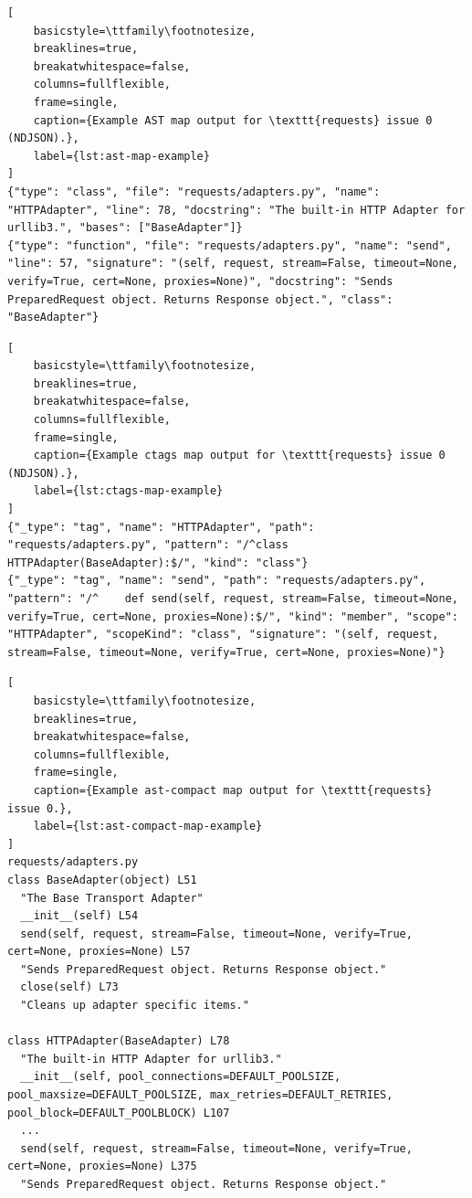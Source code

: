 
\begin{lstlisting}[
    basicstyle=\ttfamily\footnotesize,
    breaklines=true,
    breakatwhitespace=false,
    columns=fullflexible,
    frame=single,
    caption={Example AST map output for \texttt{requests} issue 0 (NDJSON).},
    label={lst:ast-map-example}
]
{"type": "class", "file": "requests/adapters.py", "name": "HTTPAdapter", "line": 78, "docstring": "The built-in HTTP Adapter for urllib3.", "bases": ["BaseAdapter"]}
{"type": "function", "file": "requests/adapters.py", "name": "send", "line": 57, "signature": "(self, request, stream=False, timeout=None, verify=True, cert=None, proxies=None)", "docstring": "Sends PreparedRequest object. Returns Response object.", "class": "BaseAdapter"}
\end{lstlisting}

\begin{lstlisting}[
    basicstyle=\ttfamily\footnotesize,
    breaklines=true,
    breakatwhitespace=false,
    columns=fullflexible,
    frame=single,
    caption={Example ctags map output for \texttt{requests} issue 0 (NDJSON).},
    label={lst:ctags-map-example}
]
{"_type": "tag", "name": "HTTPAdapter", "path": "requests/adapters.py", "pattern": "/^class HTTPAdapter(BaseAdapter):$/", "kind": "class"}
{"_type": "tag", "name": "send", "path": "requests/adapters.py", "pattern": "/^    def send(self, request, stream=False, timeout=None, verify=True, cert=None, proxies=None):$/", "kind": "member", "scope": "HTTPAdapter", "scopeKind": "class", "signature": "(self, request, stream=False, timeout=None, verify=True, cert=None, proxies=None)"}
\end{lstlisting}

\begin{lstlisting}[
    basicstyle=\ttfamily\footnotesize,
    breaklines=true,
    breakatwhitespace=false,
    columns=fullflexible,
    frame=single,
    caption={Example ast-compact map output for \texttt{requests} issue 0.},
    label={lst:ast-compact-map-example}
]
requests/adapters.py
class BaseAdapter(object) L51
  "The Base Transport Adapter"
  __init__(self) L54
  send(self, request, stream=False, timeout=None, verify=True, cert=None, proxies=None) L57
  "Sends PreparedRequest object. Returns Response object."
  close(self) L73
  "Cleans up adapter specific items."

class HTTPAdapter(BaseAdapter) L78
  "The built-in HTTP Adapter for urllib3."
  __init__(self, pool_connections=DEFAULT_POOLSIZE, pool_maxsize=DEFAULT_POOLSIZE, max_retries=DEFAULT_RETRIES, pool_block=DEFAULT_POOLBLOCK) L107
  ...
  send(self, request, stream=False, timeout=None, verify=True, cert=None, proxies=None) L375
  "Sends PreparedRequest object. Returns Response object."
\end{lstlisting}
